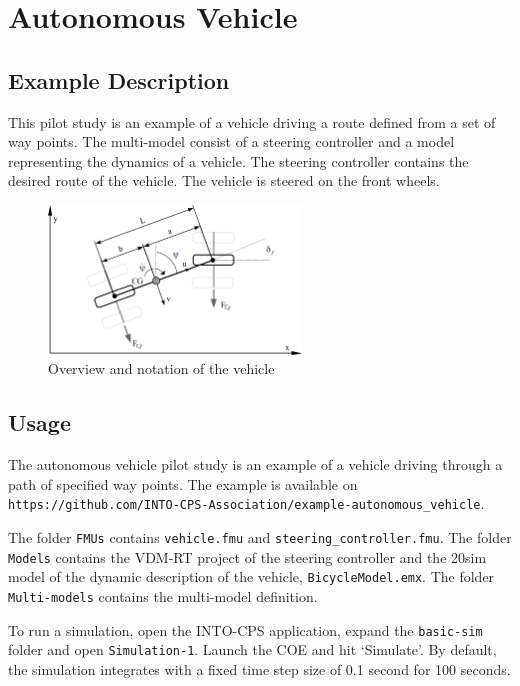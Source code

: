 \section{Autonomous Vehicle}
\label{sec:bicycle}

\subsection{Example Description}
This pilot study is an example of a vehicle driving a route defined from a set of way points. The multi-model consist of a steering controller and a model representing the dynamics of a vehicle. The steering controller contains the desired route of the vehicle. The vehicle is steered on the front wheels. 

\begin{figure}[htbp]
\begin{center}
\includegraphics[width=0.6\textwidth]{vehicle/bicycle.png}
\caption{Overview and notation of the vehicle}
\label{fig:bicyclemodel_overview}
\end{center}
\end{figure}

\subsection{Usage} \label{sec:bicycle_usage}
The autonomous vehicle pilot study is an example of a vehicle driving through a path of specified way points. The example is available on \texttt{https://github.com/INTO-CPS-Association/example-autonomous\_vehicle}. 

The folder \texttt{FMUs} contains \texttt{vehicle.fmu} and \texttt{steering\_controller.fmu}. The folder \texttt{Models} contains the VDM-RT project of the steering controller and the 20sim model of the dynamic description of the vehicle, \texttt{BicycleModel.emx}. The folder \texttt{Multi-models} contains the multi-model definition.  

To run a simulation, open the INTO-CPS application, expand the \texttt{basic-sim} folder and open \texttt{Simulation-1}. Launch the COE and hit `Simulate'. 
By default, the simulation integrates with a fixed time step size of 0.1 second for 100 seconds. \newline

